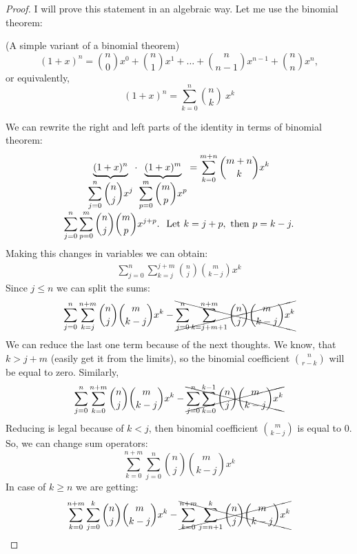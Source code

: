 \documentclass[12pt]{report}
\begin{document}
\begin{proof}
    I will prove this statement in an algebraic way. Let me use the binomial theorem:
    \begin{theorema}{(A simple variant of a binomial theorem)}{}
        \[
            (1 + x)^n = \binom{n}{0}x^0 + \binom{n}{1}x^1 + \ldots + \binom{n}{n-1}x^{n-1} + \binom{n}{n}x^n,  
        \]
        or equivalently,
        \[
            (1+x)^n = \sum\limits_{k=0}^n \binom{n}{k}\  x^k 
        \]
    \end{theorema}
    We can rewrite the right and left parts of the identity in terms of binomial theorem:
    \[
        \begin{array}{c}
            \displaystyle \underbrace{(1+x)^n}_{\displaystyle\sum\limits_{j=0}^n \binom{n}{j}x^j} \cdot \underbrace{(1+x)^m}_{\displaystyle \sum\limits_{p=0}^m \binom{m}{p} x^p} = \sum\limits_{k=0}^{m+n} \binom{m+n}{k} x^k \\
            \displaystyle \sum\limits_{j=0}^n\sum\limits_{p=0}^m \binom{n}{j} \binom{m}{p} x^{j+p}. \hspace*{0.25cm} \text{Let } k = j+p, \text{ then } p = k - j.\\
        \end{array}  
    \]
    Making this changes in variables we can obtain:
    \[
        \begin{array}{c}
            \displaystyle \sum\limits_{j=0}^n\sum\limits_{k = j}^{j+m} \binom{n}{j} \binom{m}{k-j} x^k           
        \end{array}
    \]
    Since $j \leq n$ we can split the sums:
    \[
        \sum\limits_{j=0}^n \sum\limits_{k=j}^{n+m} \binom{n}{j} \binom{m}{k - j} x^k - \xcancel{\sum\limits_{j=0}^n \sum\limits_{k = j + m + 1}^{n+m} \binom{n}{j} \binom{m}{k - j} x^k}
    \]
    We can reduce the last one term because of the next thoughts. We know, that $k > j+m$ (easily get it from the limits), so the binomial coefficient $\displaystyle \binom{n}{r-k}$ will be equal to zero. Similarly, 
    \[
        \sum\limits_{j=0}^n \sum\limits_{k=0}^{n+m} \binom{n}{j} \binom{m}{k - j} x^k - \xcancel{\sum\limits_{j=0}^n \sum\limits_{k=0}^{k-1} \binom{n}{j} \binom{m}{k - j} x^k}
    \]
    Reducing is legal because of $k < j$, then binomial coefficient $\displaystyle \binom{m}{k-j}$ is equal to $0$. So, we can change sum operators:
    \[
        \sum\limits_{k=0}^{n+m}\sum\limits_{j=0}^n \binom{n}{j} \binom{m}{k-j} x^k  
    \]
    In case of $k \geq n$ we are getting:
    \[
        \sum\limits_{k=0}^{n+m}\sum\limits_{j=0}^{k} \binom{n}{j} \binom{m}{k-j} x^k - \xcancel{\sum\limits_{k=0}^{n+m}\sum\limits_{j = n+1}^k \binom{n}{j} \binom{m}{k-j} x^k}
\]
\end{proof}
\end{document}
